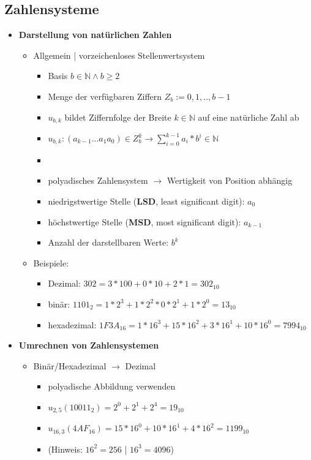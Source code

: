 \subsection{Zahlensysteme}
\begin{itemize}

\item \textbf{Darstellung von natürlichen Zahlen}
	\begin{itemize}
	\item Allgemein | vorzeichenloses Stellenwertsystem
		\begin{itemize}
		\item Basis $b \in \mathbb{N} \land b \geq 2$
		\item Menge der verfügbaren Ziffern $Z_b := {0,1,..,b - 1}$
		\item $u_{b,k}$ bildet Ziffernfolge der Breite $k \in \mathbb{N}$ auf eine natürliche Zahl ab 
		\item $u_{b,k} : (a_{k-1}...a_1a_0) \in Z^k_b \rightarrow \sum^{k-1}_{i=0} a_i * b^i \in \mathbb{N}$
		\item[]
		\item polyadisches Zahlensystem $\rightarrow$ Wertigkeit von Position abhängig
		\item niedrigstwertige Stelle (\textbf{LSD}, least significant digit): $a_0$
		\item höchstwertige Stelle (\textbf{MSD}, most significant digit): $a_{k-1}$
		\item Anzahl der darstellbaren Werte: $b^k$
		\end{itemize}
	
	\item Beispiele:
		\begin{itemize}
		\item Dezimal: $302 = 3 * 100 + 0 * 10 + 2 * 1 = 302_{10}$
		\item binär: $1101_2 = 1 * 2^3 + 1 * 2^2 * 0 * 2^1 + 1 * 2^0 = 13_{10}$
		\item hexadezimal: $1F3A_16 = 1 * 16^3 + 15 * 16^2 + 3 * 16^1 + 10 * 16^0 = 7994_{10}$
		\end{itemize}
	\end{itemize}

\item \textbf{Umrechnen von Zahlensystemen}
	\begin{itemize}
	\item Binär/Hexadezimal $\rightarrow$ Dezimal
		\begin{itemize}
		\item polyadische Abbildung verwenden
		\item $u_{2,5}(1 0011_2) = 2^0 + 2^1 + 2^4 = 19_{10}$
		\item $u_{16,3}(4AF_{16}) = 15 *16^0 + 10 * 16^1 + 4 * 16^2 = 1199_{10}$
		\item (Hinweis: $16^2 = 256$ | $16^3 = 4096$)
		\end{itemize}
	

\end{itemize}
\end{itemize}
